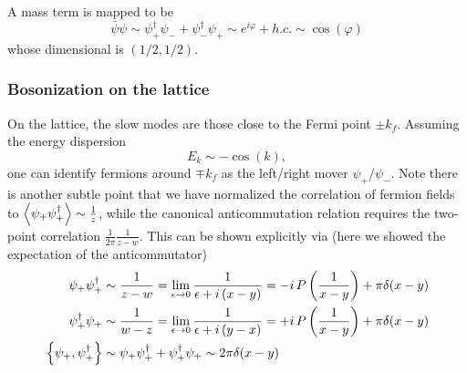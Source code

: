 A mass term is mapped to be 
\begin{equation}
	\bar{\psi} \psi \sim \psi_{+}^\dagger \psi_{-} + \psi_{-}^\dagger \psi_{+} \sim e^{i\varphi} + h.c. \sim \cos\left(\varphi\right)
\end{equation}
whose dimensional is $\left(1/2,1/2\right)$.


\subsubsection{Bosonization on the lattice} 
On the lattice, the slow modes are those close to the Fermi point $\pm k_f$. Assuming the energy dispersion 
\begin{equation}
	E_k \sim -\cos (k),
\end{equation}
one can identify fermions around $\mp k_f$ as the left/right mover $\psi_{+}$/$\psi_{-}$. Note there is another subtle point that we have normalized the correlation of fermion fields to $\expval{\psi_{+}\psi_{+}^\dagger} \sim \frac{1}{z}$, while the canonical anticommutation relation requires the two-point correlation $\frac{1}{2\pi}\frac{1}{z-w}$. This can be shown explicitly via (here we showed the expectation of the anticommutator)
\begin{equation}
	\begin{aligned}
		\psi_{+}\psi_{+}^\dagger & \sim \frac{1}{z-w} = \lim_{\epsilon\rightarrow 0} \frac{1}{\epsilon + i\left(x-y\right)} = -i\,P\left(\frac{1}{x-y}\right) + \pi \delta(x-y)\\
		\psi_{+}^\dagger\psi_{+} & \sim \frac{1}{w-z} = \lim_{\epsilon\rightarrow 0} \frac{1}{\epsilon + i\left(y-x\right)} = +i\,P\left(\frac{1}{x-y}\right) + \pi \delta(x-y)\\
		\anticommutator{\psi_{+}}{\psi_{+}^\dagger} & \sim \psi_{+}\psi_{+}^\dagger + \psi_{+}^\dagger\psi_{+} \sim 2\pi \delta(x-y)
	\end{aligned}
\end{equation}


